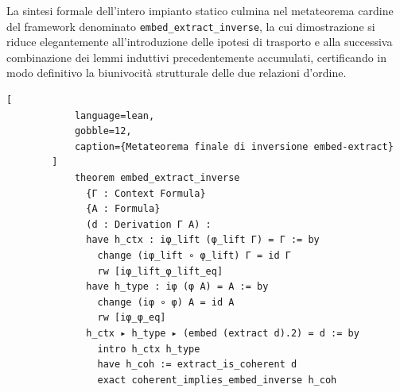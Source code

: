 La sintesi formale dell'intero impianto statico culmina nel metateorema cardine del framework denominato \texttt{embed\_extract\_inverse}, la cui dimostrazione si riduce elegantemente all'introduzione delle ipotesi di trasporto 
e alla successiva combinazione dei lemmi induttivi precedentemente accumulati, certificando in modo definitivo la biunivocità strutturale delle due relazioni d'ordine.
\begin{center}
    \begin{minipage}{\textwidth}
        \begin{lstlisting}[
            language=lean, 
            gobble=12,
            caption={Metateorema finale di inversione embed-extract}
        ]
            theorem embed_extract_inverse 
              {Γ : Context Formula} 
              {A : Formula}
              (d : Derivation Γ A) :
              have h_ctx : iφ_lift (φ_lift Γ) = Γ := by
                change (iφ_lift ∘ φ_lift) Γ = id Γ
                rw [iφ_lift_φ_lift_eq]
              have h_type : iφ (φ A) = A := by
                change (iφ ∘ φ) A = id A
                rw [iφ_φ_eq]
              h_ctx ▸ h_type ▸ (embed (extract d).2) = d := by
                intro h_ctx h_type
                have h_coh := extract_is_coherent d
                exact coherent_implies_embed_inverse h_coh
        \end{lstlisting}
    \end{minipage}
\end{center}

